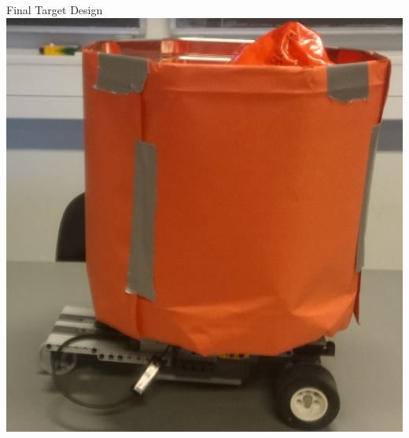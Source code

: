 \begin{frame}{Final Target Design}
\includegraphics[scale=0.1]{figures/GlorTarget.JPG}
\end{frame}






